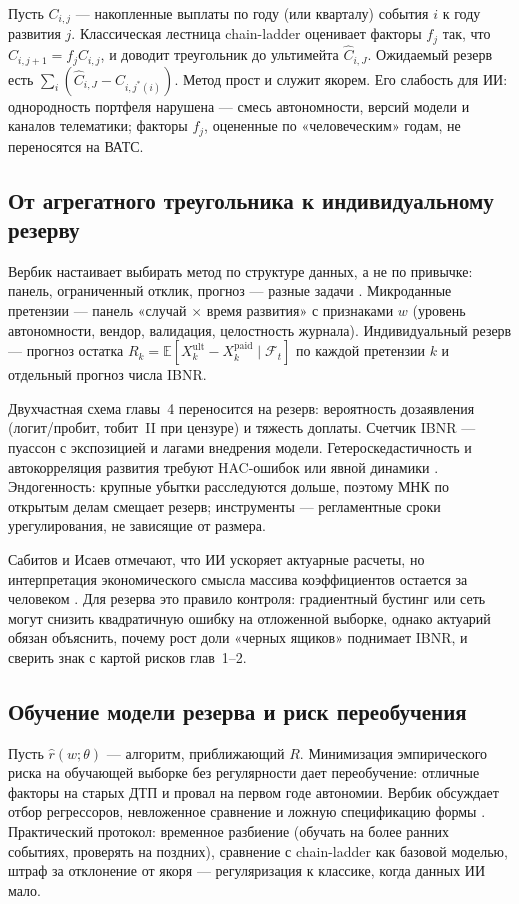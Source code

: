 \documentclass[a4paper,14pt]{extarticle}
\begin{document}
Пусть $C_{i,j}$ --- накопленные выплаты по году (или кварталу) события $i$ к году развития $j$. Классическая лестница chain-ladder оценивает факторы $f_j$ так, что $\widehat C_{i,j+1}=f_j C_{i,j}$, и доводит треугольник до ультимейта $\widehat C_{i,J}$. Ожидаемый резерв есть $\sum_i(\widehat C_{i,J}-C_{i,j^*(i)})$. Метод прост и служит якорем. Его слабость для ИИ: однородность портфеля нарушена --- смесь автономности, версий модели и каналов телематики; факторы $f_j$, оцененные по «человеческим» годам, не переносятся на ВАТС.

\subsection{От агрегатного треугольника к индивидуальному резерву}

Вербик настаивает выбирать метод по структуре данных, а не по привычке: панель, ограниченный отклик, прогноз --- разные задачи \cite{verbeek}. Микроданные претензии --- панель «случай $\times$ время развития» с признаками $w$ (уровень автономности, вендор, валидация, целостность журнала). Индивидуальный резерв --- прогноз остатка $R_k=\mathbb{E}[X_k^{\mathrm{ult}}-X_k^{\mathrm{paid}}\mid \mathcal{F}_t]$ по каждой претензии $k$ и отдельный прогноз числа IBNR.

Двухчастная схема главы~4 переносится на резерв: вероятность дозаявления (логит/пробит, тобит~II при цензуре) и тяжесть доплаты. Счетчик IBNR --- пуассон с экспозицией и лагами внедрения модели. Гетероскедастичность и автокорреляция развития требуют HAC-ошибок или явной динамики \cite{verbeek}. Эндогенность: крупные убытки расследуются дольше, поэтому МНК по открытым делам смещает резерв; инструменты --- регламентные сроки урегулирования, не зависящие от размера.

Сабитов и Исаев отмечают, что ИИ ускоряет актуарные расчеты, но интерпретация экономического смысла массива коэффициентов остается за человеком \cite{sabitov}. Для резерва это правило контроля: градиентный бустинг или сеть могут снизить квадратичную ошибку на отложенной выборке, однако актуарий обязан объяснить, почему рост доли «черных ящиков» поднимает IBNR, и сверить знак с картой рисков глав~1--2.

\subsection{Обучение модели резерва и риск переобучения}

Пусть $\hat r(w;\theta)$ --- алгоритм, приближающий $R$. Минимизация эмпирического риска на обучающей выборке без регулярности дает переобучение: отличные факторы на старых ДТП и провал на первом годе автономии. Вербик обсуждает отбор регрессоров, невложенное сравнение и ложную спецификацию формы \cite{verbeek}. Практический протокол: временное разбиение (обучать на более ранних событиях, проверять на поздних), сравнение с chain-ladder как базовой моделью, штраф за отклонение от якоря --- регуляризация к классике, когда данных ИИ мало.
\end{document}
